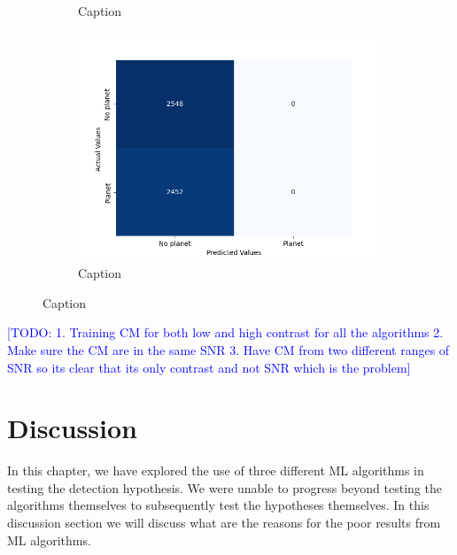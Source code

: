 \begin{figure}
\begin{subfigure}{0.4\textwidth}
        \caption{Caption}
        \label{fig:highcont_mlp}
\end{subfigure}
\vfill
\begin{subfigure}{0.5\textwidth}
        \includegraphics[scale=0.4]{images/Chapter3/confusion_ae_CV_lowcont_1e-5.png}
        \caption{Caption}
        \label{fig:highcont_ae}
\end{subfigure}
\label{figs:highcont}
\end{figure}
\textcolor{blue}{[TODO: 1. Training CM for both low and high contrast for all the algorithms
2. Make sure the CM are in the same SNR 
3. Have CM from two different ranges of SNR so its clear that its only contrast and not SNR which is the problem]}
\section{Discussion}
In this chapter, we have explored the use of three different ML algorithms in testing the detection hypothesis.
We were unable to progress beyond  testing the algorithms themselves to subsequently test the hypotheses themselves.
In this discussion section we will discuss what are the reasons for the poor results from ML algorithms.
